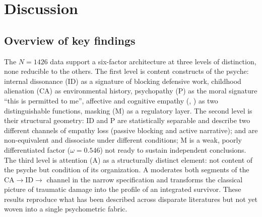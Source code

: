 \section{Discussion}
\label{sec:discussion}

\subsection{Overview of key findings}

The $N = 1426$ data support a six-factor architecture at three levels of distinction, none reducible to the others. The first level is content constructs of the psyche: internal dissonance (ID) as a signature of blocking defensive work, childhood alienation (CA) as environmental history, psychopathy (P) as the moral signature ``this is permitted to me'', affective and cognitive empathy (\EAF{}, \Ecog{}) as two distinguishable functions, masking (M) as a regulatory layer. The second level is their structural geometry: ID and P are statistically separable and describe two different channels of empathy loss (passive blocking and active narrative); \Ecog{} and \EAF{} are non-equivalent and dissociate under different conditions; M is a weak, poorly differentiated factor ($\omega = 0.546$) not ready to sustain independent conclusions. The third level is attention (A) as a structurally distinct element: not content of the psyche but condition of its organization. A moderates both segments of the CA$\to$ID$\to$\EAF{} channel in the narrow specification and transforms the classical picture of traumatic damage into the profile of an integrated survivor. These results reproduce what has been described across disparate literatures but not yet woven into a single psychometric fabric.

